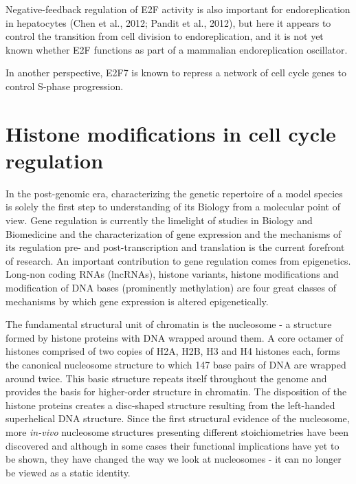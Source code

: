\documentclass[11pt,twoside,a4paper]{report}
\begin{document}
			Negative-feedback regulation of E2F activity is also important for endoreplication in hepatocytes (Chen et al., 2012; Pandit et al., 2012), but here it appears to control the transition from cell division to endoreplication, and it is not yet known whether E2F functions as part of a mammalian endoreplication oscillator.
			
			
			In another perspective, E2F7 is known to repress a network of cell cycle genes to control S-phase progression.\cite{Westendorp2012}
			\cite{Moon2008}
			\cite{Meserve2012}
			\cite{Chen2012}

	\clearpage
	\section{Histone modifications in cell cycle regulation}
	In the post-genomic era, characterizing the genetic repertoire of a model species is solely the first step to understanding of its Biology from a molecular point of view. Gene regulation is currently the limelight of studies in Biology and Biomedicine and the characterization of gene expression and the mechanisms of its regulation pre- and post-transcription and translation is the current forefront of research. An important contribution to gene regulation comes from epigenetics. Long-non coding RNAs (lncRNAs), histone variants, histone modifications and modification of DNA bases (prominently methylation) are four great classes of mechanisms by which gene expression is altered epigenetically. 
		
	The fundamental structural unit of chromatin is the nucleosome - a structure formed by histone proteins with DNA wrapped around them. A core octamer of histones comprised of two copies of H2A, H2B, H3 and H4 histones each, forms the canonical nucleosome structure to which 147 base pairs of DNA are wrapped around twice. This basic structure repeats itself throughout the genome and provides the basis for higher-order structure in chromatin. The disposition of the histone proteins creates a disc-shaped structure resulting from the left-handed superhelical DNA structure. Since the first structural evidence of the nucleosome, more \textit{in-vivo} nucleosome structures presenting different stoichiometries have been discovered and although in some cases their functional implications have yet to be shown, they have changed the way we look at nucleosomes - it can no longer be viewed as a static identity.
\end{document}
